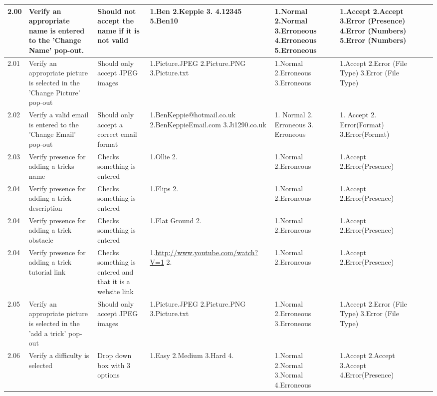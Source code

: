 \begin{landscape}
\begin{center}
\begin{longtable}{|p{1.5cm}|p{2.5cm}|p{2.5cm}|p{2cm}|p{2cm}|p{2cm}|p{2cm}|p{2cm}|}
2.00 & Verify an appropriate name is entered to the 'Change Name' pop-out. & Should not accept the name if it is not valid & 1.Ben 2.Keppie 3.   4.12345  5.Ben10 & 1.Normal 2.Normal 3.Erroneous 4.Erroneous 5.Erroneous & 1.Accept 2.Accept 3.Error (Presence) 4.Error (Numbers) 5.Error (Numbers) & & \\ \hline

2.01 & Verify an appropriate picture is selected in the 'Change Picture' pop-out & Should only accept JPEG images & 1.Picture.JPEG 2.Picture.PNG 3.Picture.txt & 1.Normal 2.Erroneous 3.Erroneous & 1.Accept 2.Error (File Type) 3.Error (File Type) & & \\ \hline

2.02 & Verify a valid email is entered to the 'Change Email' pop-out & Should only accept a correct email format & 1.BenKeppie@hotmail.co.uk 2.BenKeppieEmail.com 3.Ji1290.co.uk & 1. Normal 2. Erroneous 3. Erroneous & 1. Accept 2. Error(Format) 3.Error(Format) & & \\ \hline

2.03 & Verify presence for adding a tricks name & Checks something is entered & 1.Ollie 2.  & 1.Normal 2.Erroneous & 1.Accept 2.Error(Presence) & & \\ \hline

2.04 & Verify presence for adding a trick description & Checks something is entered & 1.Flips 2. & 1.Normal 2.Erroneous & 1.Accept 2.Error(Presence) & & \\ \hline

2.04 & Verify presence for adding a trick obstacle & Checks something is entered & 1.Flat Ground 2. & 1.Normal 2.Erroneous & 1.Accept 2.Error(Presence) & & \\ \hline

2.04 & Verify presence for adding a trick tutorial link & Checks something is entered and that it is a website link & 1.\url{http://www.youtube.com/watch?V=1} 2. & 1.Normal 2.Erroneous & 1.Accept 2.Error(Presence) & & \\ \hline

2.05 & Verify an appropriate picture is selected in the 'add a trick' pop-out & Should only accept JPEG images & 1.Picture.JPEG 2.Picture.PNG 3.Picture.txt & 1.Normal 2.Erroneous 3.Erroneous & 1.Accept 2.Error (File Type) 3.Error (File Type) & & \\ \hline

2.06 & Verify a difficulty is selected & Drop down box with 3 options & 1.Easy 2.Medium 3.Hard 4. & 1.Normal 2.Normal 3.Normal 4.Erroneous & 1.Accept 2.Accept 3.Accept 4.Error(Presence) & & \\ \hline


\end{longtable}
\end{center}
\end{landscape}
